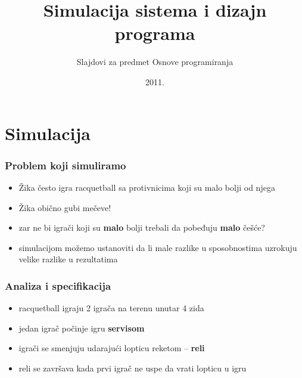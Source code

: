 \documentclass[utf8,compress]{beamer}
\title{Simulacija sistema i dizajn programa}
\subtitle{\tiny{Slajdovi za predmet Osnove programiranja}}
\institute{Katedra za informatiku, Fakultet tehničkih nauka, Novi Sad}
\date{2011.}
\begin{document}
\frame{\titlepage}


\section[Simulacija]{Simulacija}


\begin{frame}
  \frametitle{Problem koji simuliramo}
  \begin{itemize}
    \item Žika često igra racquetball sa protivnicima koji su malo bolji od njega
    \item Žika obično gubi mečeve!
    \item zar ne bi igrači koji su \textbf{malo} bolji trebali da pobeđuju \textbf{malo} češće?
    \item simulacijom možemo ustanoviti da li male razlike u sposobnostima uzrokuju velike razlike u rezultatima
  \end{itemize}
\end{frame}

\begin{frame}
  \frametitle{Analiza i specifikacija}
  \begin{itemize}
    \item racquetball igraju 2 igrača na terenu unutar 4 zida
    \item jedan igrač počinje igru \textbf{servisom}
    \item igrači se smenjuju udarajući lopticu reketom -- \textbf{reli}
    \item reli se završava kada prvi igrač ne uspe da vrati lopticu u igru
  \end{itemize}
\end{frame}
\end{document}
